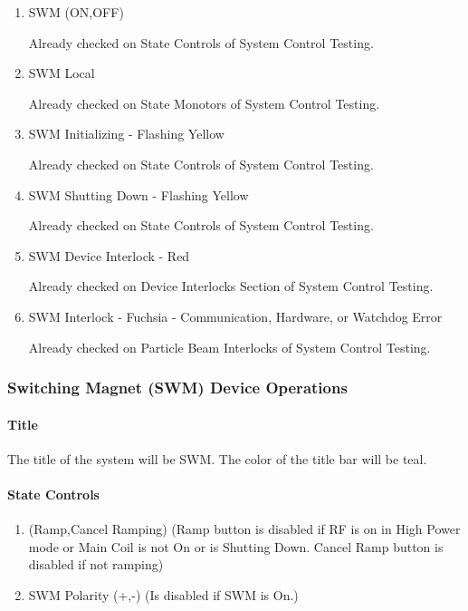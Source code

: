 \documentclass[11pt]{book}		%
\begin{document}
\begin{enumerate}
 \item SWM (ON,OFF)

\color{red}
Already checked on State Controls of System Control Testing.
\color{black}

 \item SWM Local

\color{red}
Already checked on State Monotors of System Control Testing.
\color{black}

 \item SWM Initializing - Flashing Yellow

\color{red}
Already checked on State Controls of System Control Testing.
\color{black}

 \item SWM Shutting Down - Flashing Yellow

\color{red}
Already checked on State Controls of System Control Testing.
\color{black}

 \item SWM Device Interlock - Red

\color{red}
Already checked on Device Interlocks Section of System Control Testing.
\color{black}

 \item SWM Interlock - Fuchsia - Communication, Hardware, or Watchdog Error

\color{red}
Already checked on Particle Beam Interlocks of System Control Testing.
\color{black}

\end{enumerate}

\subsubsection{Switching Magnet (SWM) Device Operations}

\paragraph{Title} \label{sect:cyc-op-interface-ops-terminal-device-ops-gcc-title}

The title of the system will be SWM.  The color of the title bar will be teal.

\paragraph{State Controls}

\begin{enumerate}
 \item (Ramp,Cancel Ramping) (Ramp button is disabled if RF is on in High Power mode or Main Coil is not On or is Shutting Down.  Cancel Ramp button is disabled if not ramping)
 \item SWM Polarity (+,-) (Is disabled if SWM is On.)
\end{enumerate}
\end{document}
